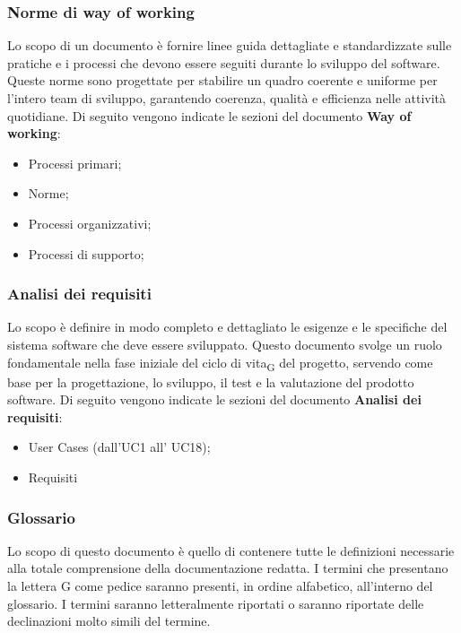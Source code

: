 \documentclass{article}
\begin{document}
\subsubsection*{Norme di way of working}
Lo scopo di un documento  è fornire linee guida dettagliate e standardizzate sulle pratiche e i processi che devono essere seguiti durante lo sviluppo del software. Queste norme sono progettate per stabilire un quadro coerente e uniforme per l'intero team di sviluppo, garantendo coerenza, qualità e efficienza nelle attività quotidiane. Di seguito vengono indicate le sezioni del documento \textbf{Way of working}:\begin{itemize}
    \item Processi primari;
    \item Norme;
    \item Processi organizzativi;
    \item Processi di supporto;
\end{itemize}

\subsubsection*{Analisi dei requisiti}
Lo scopo è definire in modo completo e dettagliato le esigenze e le specifiche del sistema software che deve essere sviluppato. Questo documento svolge un ruolo fondamentale nella fase iniziale del ciclo di vita\textsubscript{G} del progetto, servendo come base per la progettazione, lo sviluppo, il test e la valutazione del prodotto software.
Di seguito vengono indicate le sezioni del documento \textbf{Analisi dei requisiti}:\begin{itemize}
    \item User Cases (dall'UC1 all' UC18);
    \item Requisiti
\end{itemize}
\subsubsection*{Glossario}
Lo scopo di questo documento è quello di contenere tutte le definizioni necessarie alla totale comprensione della documentazione redatta. I termini che presentano la lettera G come pedice saranno presenti, in ordine alfabetico, all'interno del glossario. I termini saranno letteralmente riportati o saranno riportate delle declinazioni molto simili del termine. 
\end{document}
